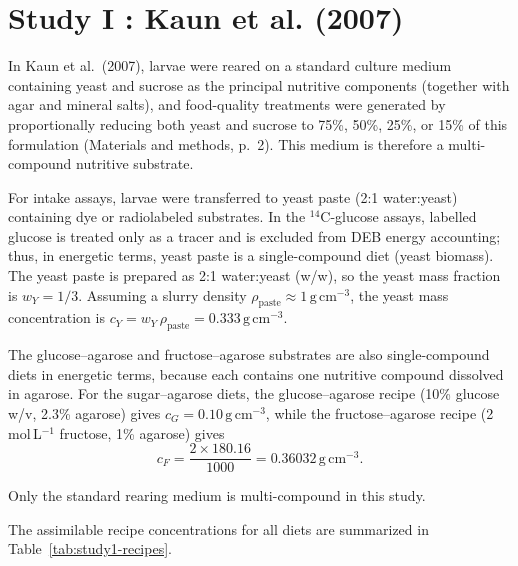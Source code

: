 \documentclass[11pt]{article}
\begin{document}
\section*{Study I : Kaun et al. (2007)}

In Kaun et al.\ (2007), larvae were reared on a standard culture medium 
containing yeast and sucrose as the principal nutritive components 
(together with agar and mineral salts), and food-quality treatments were 
generated by proportionally reducing both yeast and sucrose to 75\%, 50\%, 
25\%, or 15\% of this formulation (Materials and methods, p.~2). This medium is therefore a multi-compound nutritive substrate. 

For intake assays, larvae were transferred to yeast paste (2:1 water:yeast) containing dye or radiolabeled substrates. In the $^{14}$C-glucose assays, labelled glucose is treated only as a tracer and is excluded from DEB energy accounting; thus, in energetic terms, yeast paste is a single-compound diet (yeast biomass). The yeast paste is prepared as 2:1 water:yeast (w/w), so the yeast mass fraction is $w_Y=1/3$. Assuming a slurry density $\rho_{\text{paste}}\approx 1\,\mathrm{g\,cm^{-3}}$, the yeast mass concentration is $c_Y = w_Y\,\rho_{\text{paste}} = 0.333\,\mathrm{g\,cm^{-3}}$.

The glucose--agarose and fructose--agarose substrates are also single-compound diets in energetic terms, because each contains one nutritive compound dissolved in agarose. For the sugar--agarose diets, the glucose--agarose recipe (10\% glucose w/v, 2.3\% agarose) gives $c_G=0.10\,\mathrm{g\,cm^{-3}}$, while the fructose--agarose recipe (2 mol\,L$^{-1}$ fructose, 1\% agarose) gives
\begin{equation*}
  c_F = \frac{2\times 180.16}{1000} = 0.36032\,\mathrm{g\,cm^{-3}}.
\end{equation*}

Only the standard rearing medium is multi-compound in this study.



The assimilable recipe concentrations for all diets are summarized in Table~\ref{tab:study1-recipes}.
\end{document}
